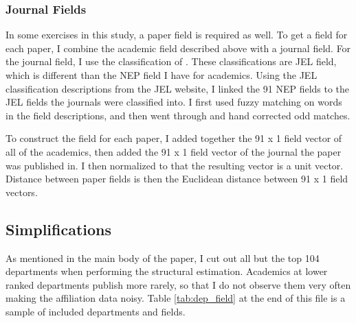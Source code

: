 \subsubsection{Journal Fields}

In some exercises in this study, a paper field is required as well. To
get a field for each paper, I combine the academic field described above
with a journal field. For the journal field, I use the classification of
\citet{barrett2000subdiscipline}. These classifications are JEL field,
which is different than the NEP field I have for academics. Using the JEL
classification descriptions from the JEL website, I linked the 91 NEP
fields to the JEL fields the journals were classified into. I first used
fuzzy matching on words in the field descriptions, and then went through
and hand corrected odd matches.

To construct the field for each paper, I added together the 91 x 1 field
vector of all of the academics, then added the 91 x 1 field vector of the
journal the paper was published in. I then normalized to that the
resulting vector is a unit vector. Distance between paper fields is then
the Euclidean distance between 91 x 1 field vectors.

\subsection{Simplifications}

As mentioned in the main body of the paper, I cut out all but the
top 104 departments when performing the structural estimation. Academics
at lower ranked departments publish more rarely, so that I do not
observe them very often making the affiliation data noisy. Table \ref{tab:dep_field} at
the end of this file is a sample of included departments and fields.

